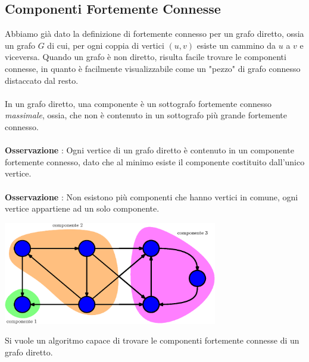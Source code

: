 \documentclass[12pt, letterpaper]{article}
\newcommand{\acc}{\\\hphantom{}\\}
\begin{document}
\subsection{Componenti Fortemente Connesse}
Abbiamo già dato la definizione di fortemente connesso per un grafo diretto, ossia un grafo $G$ di cui,
per ogni coppia di vertici $(u,v)$ esiste un cammino da $u$ a $v$ e viceversa. Quando un grafo è non diretto, risulta
facile trovare le componenti connesse, in quanto è facilmente visualizzabile come un "pezzo" di grafo connesso
distaccato dal resto.\acc
In un grafo diretto, una componente è un sottografo fortemente connesso \textit{massimale}, ossia, che non è contenuto in
un sottografo più grande fortemente connesso.\acc
\textbf{Osservazione} : Ogni vertice di un grafo diretto è contenuto in un componente fortemente connesso, dato che
al minimo esiste il componente costituito dall'unico vertice.\acc
\textbf{Osservazione} : Non esistono più componenti che hanno vertici in comune, ogni vertice appartiene ad un solo
componente.\begin{center}
    \includegraphics[width=0.7\textwidth ]{images/compoGrafDir.eps}
\end{center}
Si vuole un algoritmo capace di trovare le componenti fortemente connesse di un grafo diretto.
\end{document}

